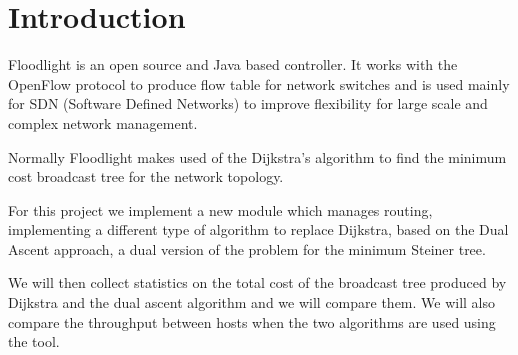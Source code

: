 \chapter{Introduction}\label{ch:intro}

Floodlight is an open source and Java based controller. It works with the
OpenFlow protocol to produce flow table for network switches and is used mainly
for SDN (Software Defined Networks) to improve flexibility for large scale and
complex network management.

Normally Floodlight makes used of the Dijkstra's algorithm to find the minimum
cost broadcast tree for the network topology.

For this project we implement a new module which manages routing, implementing a
different type of algorithm to replace Dijkstra, based on the Dual Ascent
approach, a dual version of the problem for the minimum Steiner tree.

We will then collect statistics on the total cost of the broadcast tree produced
by Dijkstra and the dual ascent algorithm and we will compare them. We will also
compare the throughput between hosts when the two algorithms are used using the
 tool.
